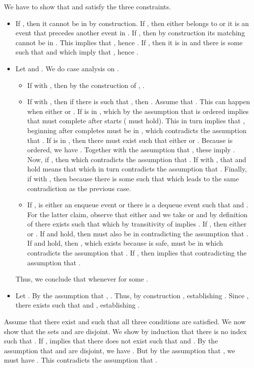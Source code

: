 \documentclass{LMCS}
\begin{document}
We have to show that  and  satisfy the three constraints.
\begin{itemize}
\item If , then it cannot be in  by construction.
If , then either  belongs to  or it is an event that precedes another event in .
If , then by construction its matching  cannot be in .
This implies that , hence .
If , then it is in  and there is some  such that  and  which imply that , hence .
\item Let  and .
We do case analysis on .
\begin{itemize}
\item If  with , then by the construction of , .
\item If  with , then if there is  such that , then .
Assume that .
This can happen when either  or . 
If  is in , which by the assumption that  is ordered implies that  must complete after  starts ( must hold).
This in turn implies that , beginning after  completes must be in , which contradicts the assumption that .
If  is in , then there must exist  such that either  or .
Because  is ordered, we have .
Together with the assumption that , these imply . 
Now, if , then  which contradicts the assumption that .
If  with , that  and  hold means that  which in turn contradicts the assumption that .
Finally, if  with , then because  there is some  such that  which leads to the same contradiction as the previous case.
\item If ,  is either an enqueue event  or there is a dequeue event  such that  and .
For the latter claim, observe that either  and we take  or  and by definition of  there exists  such that  which by transitivity of  implies .
If , then either  or .
If  and  hold, then  must also be in  contradicting the assumption that .
If  and  hold, then , which exists because  is safe, must be in  which contradicts the assumption that .
If , then  implies that  contradicting the assumption that .
\end{itemize}
Thus, we conclude that  whenever  for some .
\item Let .
By the assumption that , .
Thus, by construction  , establishing .
Since , there exists  such that  and , establishing .
\end{itemize}

\noindent{\bf ()}
Assume that there exist  and  such that all three conditions are satisfied.
We now show that the sets  and  are disjoint.
We show by induction that there is no index  such that .
If ,   implies that there does not exist  such that  and .
By the assumption that  and  are disjoint, we have .
But by the assumption that , we must have .
This contradicts the assumption that .
\end{document}

